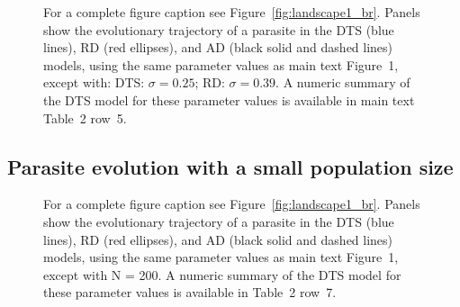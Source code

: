 \documentclass{article}
\newcommand{\figref}[1]{Figure~\ref{fig:#1}}
\begin{document}
\begin{figure}[H]
\caption{For a complete figure caption see \figref{landscape1_br}. Panels show the evolutionary trajectory of a parasite in the DTS (blue lines), RD (red ellipses), and AD (black solid and dashed lines) models, using the same parameter values as main text Figure~1, except with: DTS: $\sigma = 0.25$; RD: $\sigma = 0.39$. A numeric summary of the DTS model for these parameter values is available in main text Table~2 row~5.} 
\label{fig:landscape1_high_var}
\end{figure} 
\clearpage

\subsection*{Parasite evolution with a small population size}

\begin{figure}[H]
\caption{For a complete figure caption see \figref{landscape1_br}. Panels show the evolutionary trajectory of a parasite in the DTS (blue lines), RD (red ellipses), and AD (black solid and dashed lines) models, using the same parameter values as main text Figure~1, except with N = 200. A numeric summary of the DTS model for these parameter values is available in Table~2 row~7.} 
\label{fig:landscape1_small_pop}
\end{figure} 
\clearpage
\end{document}
